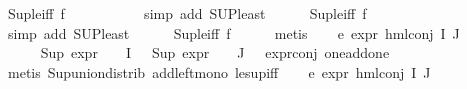 \begin{isabellebody}
\isamarkupfalse%
\ Sup{\isacharunderscore}{\kern0pt}le{\isacharunderscore}{\kern0pt}iff\ f{}\isanewline
\ \ \ \ \ \ \ \ \ \isamarkupfalse%
\ {\isacharparenleft}{\kern0pt}simp\ add{\isacharcolon}{\kern0pt}\ SUP{\isacharunderscore}{\kern0pt}least{\isacharparenright}{\kern0pt}\isanewline
\ \ \ \ \isamarkupfalse%
\ Sup{\isacharunderscore}{\kern0pt}le{\isacharunderscore}{\kern0pt}iff\ f{}\isanewline
\ \ \ \ \ \ \ \ \ \isamarkupfalse%
\ {\isacharparenleft}{\kern0pt}simp\ add{\isacharcolon}{\kern0pt}\ SUP{\isacharunderscore}{\kern0pt}least{\isacharparenright}{\kern0pt}\isanewline
\ \ \ \ \isamarkupfalse%
\ Sup{\isacharunderscore}{\kern0pt}le{\isacharunderscore}{\kern0pt}iff\ f{}\isanewline
\ \ \ \ \isamarkupfalse%
\ {\isacharparenleft}{\kern0pt}metis{\isacharparenright}{\kern0pt}{\isacharplus}{\kern0pt}\isanewline
\isanewline
\ \ \isamarkupfalse%
\ e{}{\isacharcolon}{\kern0pt}\ {\isachardoublequoteopen}expr{\isacharunderscore}{\kern0pt}{}\ {\isacharparenleft}{\kern0pt}hml{\isacharunderscore}{\kern0pt}conj\ I\ J\ {\isasymPhi}{\isacharparenright}{\kern0pt}\ {\isasymle}\ {}{\isachardoublequoteclose}\isanewline
\ \ \ \ \isamarkupfalse%
\ {\isacartoucheopen}Sup\ {\isacharparenleft}{\kern0pt}{\isacharparenleft}{\kern0pt}expr{\isacharunderscore}{\kern0pt}{}\ {\isasymcirc}\ {\isasymPhi}{\isacharparenright}{\kern0pt}\ {\isacharbackquote}{\kern0pt}\ I{\isacharparenright}{\kern0pt}\ {\isasymle}\ {}{\isacartoucheclose}\ {\isacartoucheopen}Sup\ {\isacharparenleft}{\kern0pt}{\isacharparenleft}{\kern0pt}expr{\isacharunderscore}{\kern0pt}{}\ {\isasymcirc}\ {\isasymPhi}{\isacharparenright}{\kern0pt}\ {\isacharbackquote}{\kern0pt}\ J{\isacharparenright}{\kern0pt}\ {\isasymle}\ {}{\isacartoucheclose}\ expr{\isacharunderscore}{\kern0pt}{}{\isacharunderscore}{\kern0pt}conj\ one{\isacharunderscore}{\kern0pt}add{\isacharunderscore}{\kern0pt}one\isanewline
\ \ \ \ \isamarkupfalse%
\ {\isacharparenleft}{\kern0pt}metis\ Sup{\isacharunderscore}{\kern0pt}union{\isacharunderscore}{\kern0pt}distrib\ add{\isacharunderscore}{\kern0pt}left{\isacharunderscore}{\kern0pt}mono\ le{\isacharunderscore}{\kern0pt}sup{\isacharunderscore}{\kern0pt}iff{\isacharparenright}{\kern0pt}\isanewline
\ \ \isamarkupfalse%
\ e{}{\isacharcolon}{\kern0pt}\ {\isachardoublequoteopen}expr{\isacharunderscore}{\kern0pt}{}\ {\isacharparenleft}{\kern0pt}hml{\isacharunderscore}{\kern0pt}conj\ I\ J\ {\isasymPhi}{\isacharparenright}{\kern0pt}\ {\isasymle}\ {}{\isachardoublequoteclose}\isanewline

\end{isabellebody}
